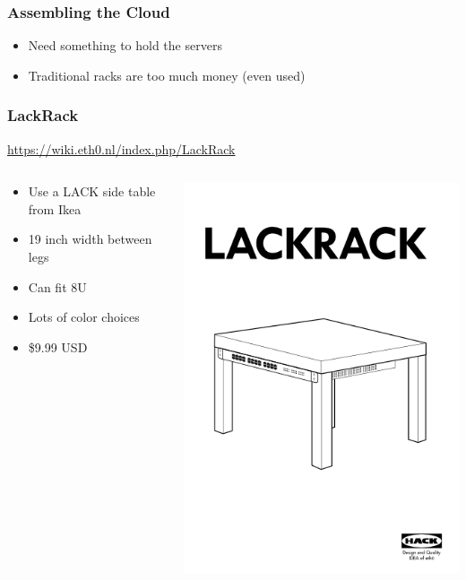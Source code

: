 \documentclass[aspectratio=169,11pt,hyperref={colorlinks=true}]{beamer}
\begin{document}
\begin{frame}
\frametitle{Assembling the Cloud}
    \begin{itemize}
        \item Need something to hold the servers
        \item Traditional racks are too much money (even used)
    \end{itemize}
\end{frame}

\begin{frame}
    \frametitle{LackRack}
    \href{https://wiki.eth0.nl/index.php/LackRack}{https://wiki.eth0.nl/index.php/LackRack}
    \begin{columns}[T]
        \begin{column}{.48\textwidth}
            \begin{itemize}
                \item Use a LACK side table from Ikea
                \item 19 inch width between legs
                \item Can fit 8U
                \item Lots of color choices
                \item \$9.99 USD
            \end{itemize}
        \end{column}
        \begin{column}{.48\textwidth}
            \includegraphics[width=\textwidth]{lackrack_cover.png}

\end{column}
\end{columns}
\end{frame}
\end{document}

